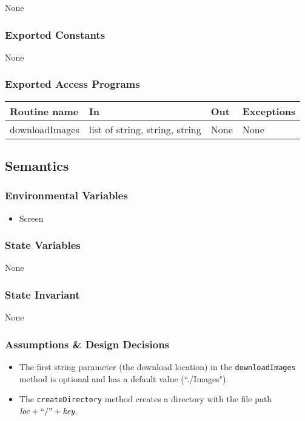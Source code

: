 \documentclass{article}
\begin{document}
None

\subsubsection* {Exported Constants}

None

\subsubsection* {Exported Access Programs}

\begin{tabular}{| l | l | l | p{5cm} |}
\hline
\textbf{Routine name} & \textbf{In} & \textbf{Out} & \textbf{Exceptions}\\
\hline
downloadImages & list of string, string, string & None & None\\
\hline

\end{tabular}

\subsection* {Semantics}

\subsubsection* {Environmental Variables}

\begin{itemize}
\item Screen
\end{itemize}

\subsubsection* {State Variables}

None

\subsubsection* {State Invariant}

None

\subsubsection* {Assumptions \& Design Decisions}

\begin{itemize}
\item The first string parameter (the download location) in the \texttt{downloadImages} method is optional and has a default value (``./Images").
\item The \texttt{createDirectory} method creates a directory with the file path $\mathit{loc} + ``/" + \mathit{key}$.
\end{itemize}
\end{document}

